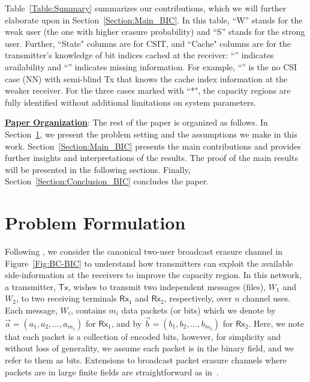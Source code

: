 \documentclass[journal,12pt,draftcls,onecolumn]{IEEEtran}
\newcommand{\cmark}{\ding{51}}%
\newcommand{\xmark}{\ding{55}}%
\newcommand{\msf}{\mathsf}
\begin{document}
Table~\ref{Table:Summary} summarizes our contributions, which we will further elaborate upon in Section~\ref{Section:Main_BIC}. In this table, ``W'' stands for the weak user (the one with higher erasure probability) and ``S'' stands for the strong user. Further, ``State" columns are for CSIT, and ``Cache" columns are for the transmitter's knowledge of bit indices cached at the receiver: ``\cmark'' indicates availability and ``\xmark'' indicates missing information. For example, ``\xmark \xmark \cmark \xmark'' is the no CSI case (NN) with semi-blind Tx that knows the cache index information at the weaker receiver. For the three cases marked with ``*", the capacity regions are fully identified without additional limitations on system parameters.



\noindent \underline{\bf Paper Organization}: The rest of the paper is organized as follows. In Section~\ref{Section:Problem_BIC}, we present the problem setting and the assumptions we make in this work. Section~\ref{Section:Main_BIC} presents the main contributions and provides further insights and interpretations of the results. The proof of the main results will be presented in the following sections. Finally, Section~\ref{Section:Conclusion_BIC} concludes the paper.


\section{Problem Formulation}
\label{Section:Problem_BIC}

Following \cite{ghorbel2016content}, we consider the canonical two-user broadcast erasure channel in Figure~\ref{Fig:BC-BIC} to understand how transmitters can exploit the available side-information at the receivers to improve the capacity region. In this network, a transmitter, $\msf{Tx}$, wishes to transmit two independent messages (files), $W_1$ and $W_2$, to two receiving terminals $\msf{Rx}_1$ and $\msf{Rx}_2$, respectively, over $n$ channel uses. Each message, $W_i$, contains $m_i$ data packets (or bits) which we denote by $\vec{a} = \left( a_1,a_2,\ldots,a_{m_1} \right)$ for $\msf{Rx}_1$, and by $\vec{b} = \left(b_1,b_2,\ldots,b_{m_2} \right)$ for $\msf{Rx}_2$. Here, we note that each packet is a collection of encoded bits, however, for simplicity and without loss of generality, we assume each packet is in the binary field, and we refer to them as bits. Extensions to broadcast packet erasure channels where packets are in large finite fields are straightforward as in~\cite{ghorbel2016content}\cite{vahid2014communication}.
\end{document}
